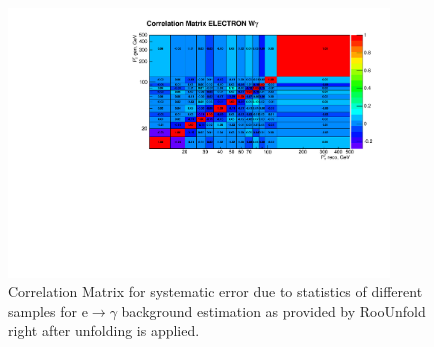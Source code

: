 \begin{figure}[htb]
  \begin{center}
\includegraphics[width=0.90\textwidth]{../figs/figs_v11/ELECTRON_WGamma/Constants/matrCorrelation_syst_etog_stat.pdf}
  \caption{Correlation Matrix for systematic error due to statistics of different samples for e$\rightarrow\gamma$ background estimation as provided by RooUnfold right after unfolding is applied.}
  \label{fig:corrMatrices_syst_etog_stat_Wg}
  \end{center}
\end{figure}

